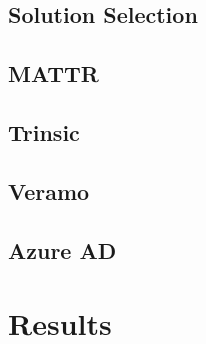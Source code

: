     \subsection{Solution Selection}
    \subsection{MATTR}
    \subsection{Trinsic}
    \subsection{Veramo}
    \subsection{Azure AD}
    \section{Results}\label{section: ri-results}
